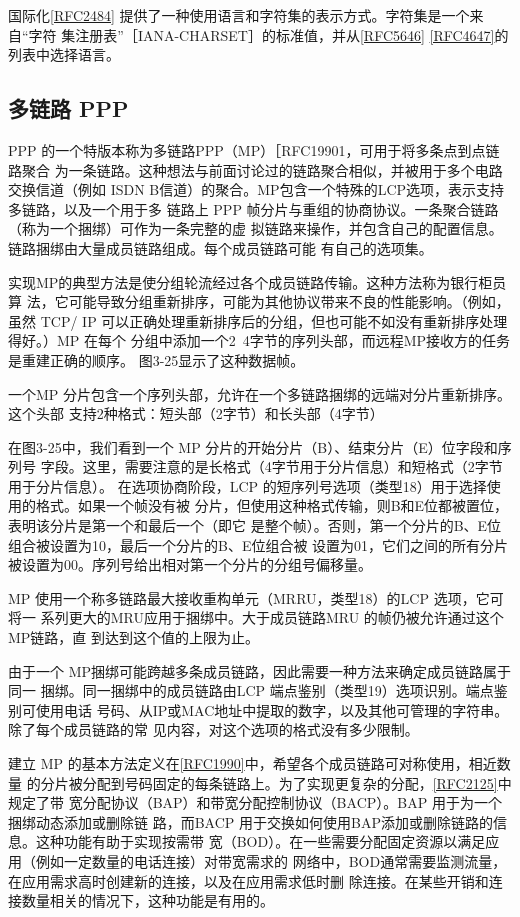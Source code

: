 国际化\href{https://www.rfc-editor.org/rfc/rfc2484}{[RFC2484]} 提供了一种使用语言和字符集的表示方式。字符集是一个来自“字符
集注册表”［IANA-CHARSET］的标准值，并从\href{https://www.rfc-editor.org/rfc/rfc5646}{[RFC5646]} \href{https://www.rfc-editor.org/rfc/rfc4647}{[RFC4647]}的列表中选择语言。

\subsection{多链路 PPP}

PPP 的一个特版本称为多链路PPP（MP）［RFC19901，可用于将多条点到点链路聚合
为一条链路。这种想法与前面讨论过的链路聚合相似，并被用于多个电路交换信道（例如
ISDN B信道）的聚合。MP包含一个特殊的LCP选项，表示支持多链路，以及一个用于多
链路上 PPP 帧分片与重组的协商协议。一条聚合链路（称为一个捆绑）可作为一条完整的虚
拟链路来操作，并包含自己的配置信息。链路捆绑由大量成员链路组成。每个成员链路可能
有自己的选项集。

实现MP的典型方法是使分组轮流经过各个成员链路传输。这种方法称为银行柜员算
法，它可能导致分组重新排序，可能为其他协议带来不良的性能影响。（例如，虽然 TCP/
IP 可以正确处理重新排序后的分组，但也可能不如没有重新排序处理得好。）MP 在每个
分组中添加一个2~4字节的序列头部，而远程MP接收方的任务是重建正确的顺序。
图3-25显示了这种数据帧。

一个MP 分片包含一个序列头部，允许在一个多链路捆绑的远端对分片重新排序。这个头部
支持2种格式：短头部（2字节）和长头部（4字节）

在图3-25中，我们看到一个 MP 分片的开始分片（B）、结束分片（E）位字段和序列号
字段。这里，需要注意的是长格式（4字节用于分片信息）和短格式（2字节用于分片信息）。
在选项协商阶段，LCP 的短序列号选项（类型18）用于选择使用的格式。如果一个帧没有被
分片，但使用这种格式传输，则B和E位都被置位，表明该分片是第一个和最后一个（即它
是整个帧）。否则，第一个分片的B、E位组合被设置为10，最后一个分片的B、E位组合被
设置为01，它们之间的所有分片被设置为00。序列号给出相对第一个分片的分组号偏移量。

MP 使用一个称多链路最大接收重构单元（MRRU，类型18）的LCP 选项，它可将一
系列更大的MRU应用于捆绑中。大于成员链路MRU 的帧仍被允许通过这个MP链路，直
到达到这个值的上限为止。

由于一个 MP捆绑可能跨越多条成员链路，因此需要一种方法来确定成员链路属于同一
捆绑。同一捆绑中的成员链路由LCP 端点鉴别（类型19）选项识别。端点鉴别可使用电话
号码、从IP或MAC地址中提取的数字，以及其他可管理的字符串。除了每个成员链路的常
见内容，对这个选项的格式没有多少限制。

建立 MP 的基本方法定义在\href{https://www.rfc-editor.org/rfc/rfc1990}{[RFC1990]}中，希望各个成员链路可对称使用，相近数量
的分片被分配到号码固定的每条链路上。为了实现更复杂的分配，\href{https://www.rfc-editor.org/rfc/rfc2125}{[RFC2125]}中规定了带
宽分配协议（BAP）和带宽分配控制协议（BACP）。BAP 用于为一个捆绑动态添加或删除链
路，而BACP 用于交换如何使用BAP添加或删除链路的信息。这种功能有助于实现按需带
宽（BOD）。在一些需要分配固定资源以满足应用（例如一定数量的电话连接）对带宽需求的
网络中，BOD通常需要监测流量，在应用需求高时创建新的连接，以及在应用需求低时删
除连接。在某些开销和连接数量相关的情况下，这种功能是有用的。

